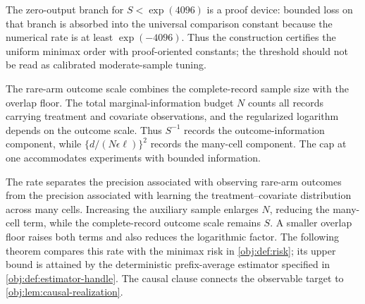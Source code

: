 \documentclass[11pt]{article}
\begin{document}
The zero-output branch for \(S<\exp(4096)\) is a proof device: bounded loss on that branch is absorbed into the universal comparison constant because the numerical rate is at least \(\exp(-4096)\). Thus the construction certifies the uniform minimax order with proof-oriented constants; the threshold should not be read as calibrated moderate-sample tuning.





The rare-arm outcome scale  combines the complete-record sample size with the overlap floor. The total marginal-information budget \(N\) counts all records carrying treatment and covariate observations, and the regularized logarithm  depends on the outcome scale. Thus \(S^{-1}\) records the outcome-information component, while \(\{d/(N\epsilon\ell)\}^2\) records the many-cell component. The cap at one accommodates experiments with bounded information.

The rate separates the precision associated with observing rare-arm outcomes from the precision associated with learning the treatment--covariate distribution across many cells. Increasing the auxiliary sample enlarges \(N\), reducing the many-cell term, while the complete-record outcome scale remains \(S\). A smaller overlap floor raises both terms and also reduces the logarithmic factor. The following theorem compares this rate with the minimax risk in \cref{obj:def:risk}; its upper bound is attained by the deterministic prefix-average estimator  specified in \cref{obj:def:estimator-handle}. The causal clause connects the observable target to \cref{obj:lem:causal-realization}.
\end{document}
